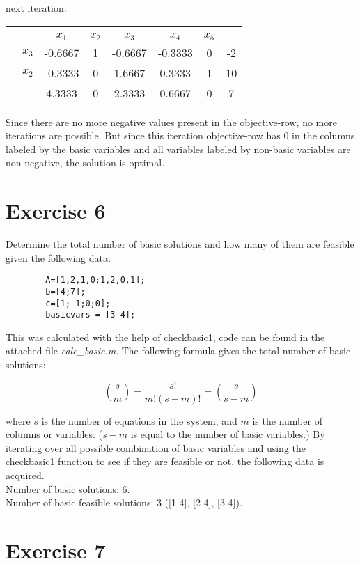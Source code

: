 \documentclass{article}
\begin{document}
    next iteration:

    \begin{center}
        \begin{tabular}{ c | c | c c c c c | c | }
            \multicolumn{1}{c}{}  & \multicolumn{1}{c}{}  &    & &     & \multicolumn{1}{c}{}\\
            \cline{2-8}
            &  & $x_1$ & $x_2$ & $x_3$ & $x_4$ & $x_5$ &\\
            \cline{2-8}
            & $x_3$ & -0.6667& 1& -0.6667& -0.3333& 0& -2\\
            & $x_2$ & -0.3333& 0& 1.6667& 0.3333& 1& 10\\
            \cline{2-8}
            & & 4.3333 & 0& 2.3333& 0.6667& 0& 7\\
            \cline{2-8}
        \end{tabular}
    \end{center}

    Since there are no more negative values present in the objective-row, no
    more iterations are possible. But since this iteration objective-row has 0
    in the columns labeled by the basic variables and all variables labeled by
    non-basic variables are non-negative, the solution is optimal.

\section*{Exercise 6}

    Determine the total number of basic solutions and how many of them are
    feasible given the following data:

    \begin{lstlisting}
        A=[1,2,1,0;1,2,0,1];
        b=[4;7];
        c=[1;-1;0;0];
        basicvars = [3 4];
    \end{lstlisting}

    \noindent
    This was calculated with the help of checkbasic1, code can be found in the
    attached file \textit{calc\_basic.m}.
    The following formula gives the total number of basic solutions:

    \begin{equation}
        \binom{s}{m} = \frac{s!}{m!(s - m)!} = \binom{s}{s-m}
    \end{equation}

    \noindent
    where $s$ is the number of equations in the system, and $m$ is the number
    of columns or variables. ($s - m$ is equal to the number of
    basic variables.) By iterating over all possible combination of basic
    variables and using the checkbasic1 function to see if they are feasible or
    not, the following data is acquired. \\

    \noindent
    Number of basic solutions: 6. \\
    Number of basic feasible solutions: 3 ([1 4], [2 4], [3 4]).


\section*{Exercise 7}
\end{document}
